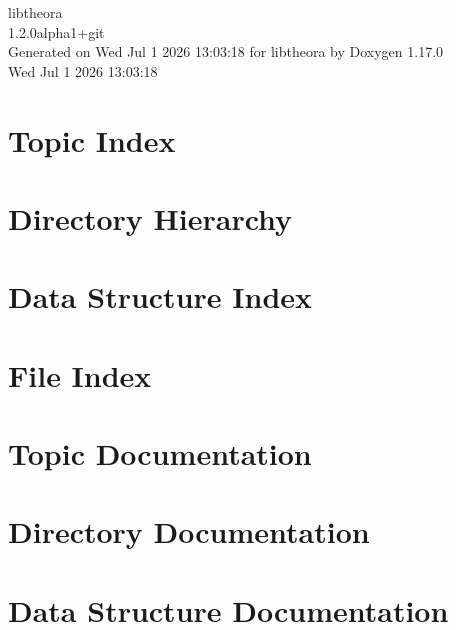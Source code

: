 \documentclass[twoside]{book}
\newcommand{\+}{\discretionary{\mbox{\scriptsize$\hookleftarrow$}}{}{}}
\newcommand{\clearemptydoublepage}{%
    \newpage{\pagestyle{empty}\cleardoublepage}%
  }
\begin{document}
  \raggedbottom
  \begin{titlepage}
  \vspace*{7cm}
  \begin{center}%
  {\Large libtheora}\\
  [1ex]\large 1.\+2.\+0alpha1+git \\
  \vspace*{1cm}
  {\large Generated on Wed Jul 1 2026 13:\+03:\+18 for libtheora by Doxygen 1.17.0}\\
    \vspace*{0.5cm}
    {\small Wed Jul 1 2026 13:03:18}
  \end{center}
  \end{titlepage}
  \clearemptydoublepage
  \tableofcontents
  \clearemptydoublepage

\chapter{Topic Index}

\chapter{Directory Hierarchy}

\chapter{Data Structure Index}

\chapter{File Index}

\chapter{Topic Documentation}




\chapter{Directory Documentation}


\chapter{Data Structure Documentation}











\end{document}
